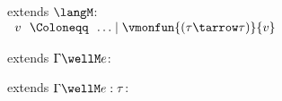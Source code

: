 \begin{flushleft}

 extends $\langM$:\\
$\begin{array}{l@{~~}c@{~~}l}
  v & \Coloneqq & \ldots \mid \vmonfun{(\tau\tarrow\tau)}{v}
\end{array}$

\medskip
\begin{minipage}[t]{\columnwidth}
 extends $\Gamma \wellM e$:
\begin{mathpar}
\end{mathpar}
\end{minipage}%
\begin{minipage}[t]{\columnwidth}
 extends $\Gamma \wellM e : \tau$:
\begin{mathpar}
\end{mathpar}
\end{minipage}


\end{flushleft}
